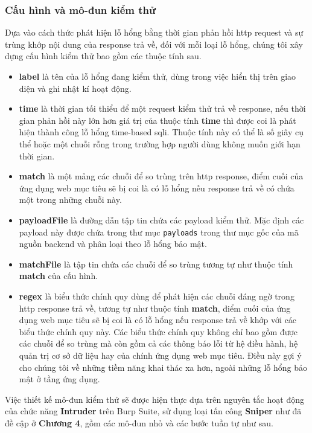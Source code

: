 \subsubsection{Cấu hình và mô-đun kiểm thử}
Dựa vào cách thức phát hiện lỗ hổng bằng thời gian phản hồi \acrshort{http} request và sự trùng khớp nội dung của response trả về, đối với mỗi loại lỗ hổng, chúng tôi xây dựng cấu hình kiểm thử bao gồm các thuộc tính sau. 
\begin{itemize}
    \item \textbf{label} là tên của lỗ hổng đang kiểm thử, dùng trong việc hiển thị trên giao diện và ghi nhật kí hoạt động.
    \item \textbf{time} là thời gian tối thiểu để một request kiểm thử trả về response, nếu thời gian phản hồi này lớn hơn giá trị của thuộc tính \textbf{time} thì được coi là phát hiện thành công lỗ hổng time-based \acrshort{sqli}. Thuộc tính này có thể là số giây cụ thể hoặc một chuỗi rỗng trong trường hợp người dùng không muốn giới hạn thời gian.
    \item \textbf{match} là một mảng các chuỗi để so trùng trên \acrshort{http} response, điểm cuối của ứng dụng web mục tiêu sẽ bị coi là có lỗ hổng nếu response trả về có chứa một trong những chuỗi này. 
    \item \textbf{payloadFile} là đường dẫn tập tin chứa các payload kiểm thử. Mặc định các payload này được chứa trong thư mục \texttt{payloads} trong thư mục gốc của mã nguồn backend và phân loại theo lỗ hổng bảo mật.
    \item \textbf{matchFile} là tập tin chứa các chuỗi để so trùng tương tự như thuộc tính \textbf{match} của cấu hình.
    \item \textbf{regex} là biểu thức chính quy dùng để phát hiện các chuỗi đáng ngờ trong \acrshort{http} response trả về, tương tự như thuộc tính \textbf{match}, điểm cuối của ứng dụng web mục tiêu sẽ bị coi là có lỗ hổng nếu response trả về khớp với các biểu thức chính quy này. Các biểu thức chính quy không chỉ bao gồm được các chuỗi để so trùng mà còn gồm cả các thông báo lỗi từ hệ điều hành, hệ quản trị cơ sở dữ liệu hay của chính ứng dụng web mục tiêu. Điều này gợi ý cho chúng tôi về những tiềm năng khai thác xa hơn, ngoài những lỗ hổng bảo mật ở tầng ứng dụng.
\end{itemize}
Việc thiết kế mô-đun kiểm thử sẽ được hiện thực dựa trên nguyên tắc hoạt động của chức năng \textbf{Intruder} trên Burp Suite, sử dụng loại tấn công \textbf{Sniper} như đã đề cập ở \textbf{Chương 4}, gồm các mô-đun nhỏ và các bước tuần tự như sau.
